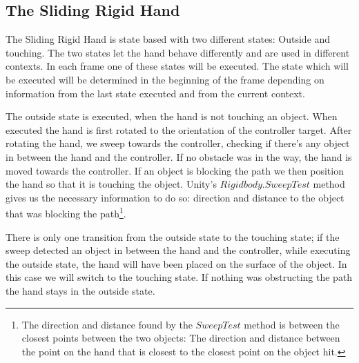 \subsection{The Sliding Rigid Hand}
\label{subsec:slidingRigidHand}
The Sliding Rigid Hand is state based with two different states: Outside and touching. The two states let the hand behave differently and are used in different contexts. In each frame one of these states will be executed. The state which will be executed will be determined in the beginning of the frame depending on information from the last state executed and from the current context.


The outside state is executed, when the hand is not touching an object. When executed the hand is first rotated to the orientation of the controller target. After rotating the hand, we sweep towards the controller, checking if there's any object in between the hand and the controller. If no obstacle was in the way, the hand is moved towards the controller. If an object is blocking the path we then position the hand so that it is touching the object. Unity's $Rigidbody.SweepTest$ method gives us the necessary information to do so: direction and distance to the object that was blocking the path\footnote{The direction and distance found by the $SweepTest$ method is between the closest points between the two objects: The direction and distance between the point on the hand that is closest to the closest point on the object hit.}.

There is only one transition from the outside state to the touching state; if the sweep detected an object in between the hand and the controller, while executing the outside state, the hand will have been placed on the surface of the object. In this case we will switch to the touching state. If nothing was obstructing the path the hand stays in the outside state.

